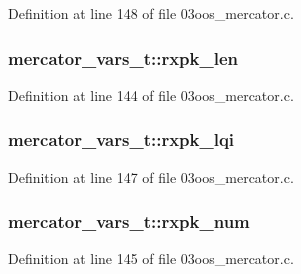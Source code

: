 Definition at line 148 of file 03oos\+\_\+mercator.\+c.

\subsubsection[{\texorpdfstring{rxpk\+\_\+len}{rxpk_len}}]{ mercator\+\_\+vars\+\_\+t\+::rxpk\+\_\+len}\hypertarget{structmercator__vars__t_ad7d058ff6e4d59982441d8a9b47b33a3}{}\label{structmercator__vars__t_ad7d058ff6e4d59982441d8a9b47b33a3}


Definition at line 144 of file 03oos\+\_\+mercator.\+c.

\subsubsection[{\texorpdfstring{rxpk\+\_\+lqi}{rxpk_lqi}}]{ mercator\+\_\+vars\+\_\+t\+::rxpk\+\_\+lqi}\hypertarget{structmercator__vars__t_aabe11892a27173caac0f0f211b3ddaa8}{}\label{structmercator__vars__t_aabe11892a27173caac0f0f211b3ddaa8}


Definition at line 147 of file 03oos\+\_\+mercator.\+c.

\subsubsection[{\texorpdfstring{rxpk\+\_\+num}{rxpk_num}}]{ mercator\+\_\+vars\+\_\+t\+::rxpk\+\_\+num}\hypertarget{structmercator__vars__t_a9821defc05c5cdceae975bd7bc15c374}{}\label{structmercator__vars__t_a9821defc05c5cdceae975bd7bc15c374}


Definition at line 145 of file 03oos\+\_\+mercator.\+c.

